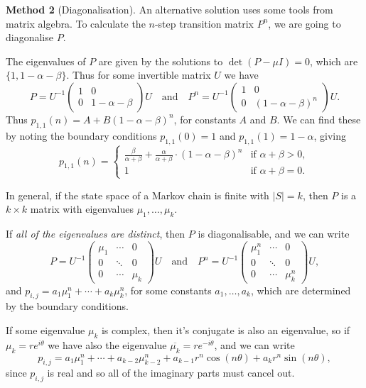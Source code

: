 \documentclass[a4paper]{scrartcl}
\begin{document}
\begin{example}
	\textbf{Method 2} (Diagonalisation). An alternative solution uses some tools from matrix algebra. To calculate the $n$-step transition matrix $P^n$, we are going to diagonalise $P$.

	The eigenvalues of $P$ are given by the solutions to $\det(P - \mu I) = 0$, which are $\{1, 1 - \alpha - \beta\}$. Thus for some invertible matrix $U$ we have
	$$
	P = U^{-1}\begin{pmatrix}
		1 & 0 \\ 0 & 1 - \alpha - \beta
	\end{pmatrix}U \quad \text{and} \quad P^n = U^{-1} \begin{pmatrix}
		1 & 0 \\ 0 & (1 - \alpha - \beta)^n
	\end{pmatrix}U.
	$$
	Thus $p_{1, 1}(n) = A + B(1 - \alpha - \beta)^n$, for constants $A$ and $B$. We can find these by noting the boundary conditions $p_{1, 1}(0) = 1$ and $p_{1, 1}(1) = 1 - \alpha$, giving
	$$
		p_{1, 1}(n) = \begin{cases}
			\frac{\beta}{\alpha+\beta}+\frac{\alpha}{\alpha+\beta} \cdot(1-\alpha-\beta)^{n} &\mbox{if } \alpha + \beta > 0, \\
			1 &\mbox{if } \alpha + \beta = 0.
		   \end{cases}
	$$
\end{example}

In general, if the state space of a Markov chain is finite with $|S| = k$, then $P$ is a $k \times k$ matrix with eigenvalues $\mu_1, \dots, \mu_k$.

If \emph{all of the eigenvalues are distinct}, then $P$ is diagonalisable, and we can write
$$
P = U^{-1} \begin{pmatrix}
	\mu_1 & \cdots & 0 \\
	0 & \ddots & 0 \\
	0 & \cdots & \mu_k
\end{pmatrix} U \quad \text{and} \quad P^n = U^{-1} \begin{pmatrix}
	\mu_1^n & \cdots & 0 \\
	0 & \ddots & 0 \\
	0 & \cdots & \mu_k^n
\end{pmatrix} U,
$$
and $p_{i,j} = a_1 \mu_1^n + \cdots + a_k \mu_k^n$, for some constants $a_1, \dots, a_k$, which are determined by the boundary conditions.

If some eigenvalue $\mu_k$ is complex, then it's conjugate is also an eigenvalue, so if $\mu_k = re^{i \theta}$ we have also the eigenvalue $\overline{\mu_k} = re^{-i \theta}$, and we can write
$$
p_{i, j} = a_1 \mu_1^n + \cdots + a_{k - 2}\mu_{k - 2}^n + a_{k - 1}r^n \cos(n \theta) + a_k r^n \sin (n \theta),
$$
since $p_{i, j}$ is real and so all of the imaginary parts must cancel out.
\end{document}
